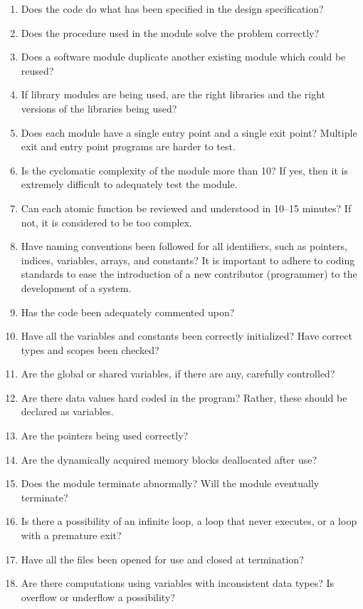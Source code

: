 \begin{enumerate}
    \item Does the code do what has been specified in the design specification?
    \item Does the procedure used in the module solve the problem correctly?
    \item Does a software module duplicate another existing module which could be reused?
    \item If library modules are being used, are the right libraries and the right versions of the libraries being used?
    \item Does each module have a single entry point and a single exit point? Multiple exit and entry point programs are harder to test.
    \item Is the cyclomatic complexity of the module more than 10? If yes, then it is extremely difficult to adequately test the module.
    \item Can each atomic function be reviewed and understood in 10–15 minutes? If not, it is considered to be too complex.
    \item Have naming conventions been followed for all identifiers, such as pointers, indices, variables, arrays, and constants? It is important to adhere to coding standards to ease the introduction of a new contributor (programmer) to the development of a system.
    \item Has the code been adequately commented upon?
    \item Have all the variables and constants been correctly initialized? Have correct types and scopes been checked?
    \item Are the global or shared variables, if there are any, carefully controlled?
    \item Are there data values hard coded in the program? Rather, these should be declared as variables.
    \item Are the pointers being used correctly?
    \item Are the dynamically acquired memory blocks deallocated after use?
    \item Does the module terminate abnormally? Will the module eventually terminate?
    \item Is there a possibility of an infinite loop, a loop that never executes, or a loop with a premature exit?
    \item Have all the files been opened for use and closed at termination?
    \item Are there computations using variables with inconsistent data types? Is overflow or underflow a possibility?

\end{enumerate}

